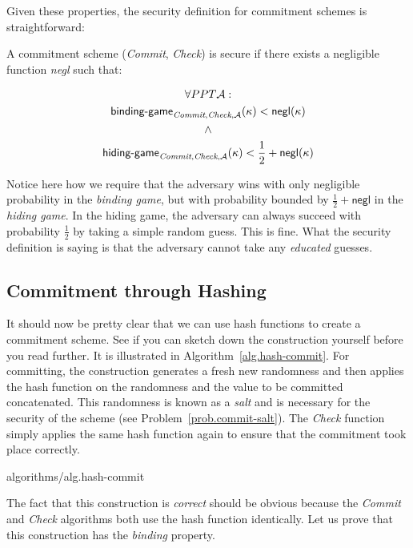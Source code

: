 Given these properties, the security definition for commitment schemes is straightforward:

\begin{definition}
  A commitment scheme (\emph{Commit}, \emph{Check}) is secure if there exists a
  negligible function \emph{negl} such that:

  \begin{gather*}
    \forall PPT \mathcal{A}:\\
    \textsf{binding-game}_{\emph{Commit},\emph{Check},\mathcal{A}}(\kappa) < \textsf{negl}(\kappa)\\
    \land\\
    \textsf{hiding-game}_{\emph{Commit},\emph{Check},\mathcal{A}}(\kappa) < \frac{1}{2} + \textsf{negl}(\kappa)\\
  \end{gather*}
\end{definition}

Notice here how we require that the adversary wins with only negligible probability in the \emph{binding game},
but with probability bounded by $\frac{1}{2} + \textsf{negl}$ in the \emph{hiding game}. In the hiding game,
the adversary can always succeed with probability $\frac{1}{2}$ by taking a simple random guess. This is fine.
What the security definition is saying is that the adversary cannot take any \emph{educated} guesses.

\subsection*{Commitment through Hashing}

It should now be pretty clear that we can use hash functions to create a commitment scheme. See if you can
sketch down the construction yourself before you read further. It is illustrated in Algorithm~\ref{alg.hash-commit}.
For committing, the construction generates a fresh new randomness and then applies the hash function
on the randomness and the value to be committed concatenated. This randomness is known as a \emph{salt}
and is necessary for the security of the scheme (see Problem~\ref{prob.commit-salt}). The \emph{Check} function
simply applies the same hash function again to ensure that the commitment took place correctly.

{algorithms/alg.hash-commit}

The fact that this construction is \emph{correct} should be obvious because the \emph{Commit} and
\emph{Check} algorithms both use the hash function identically.
Let us prove that this construction has the \emph{binding} property.

